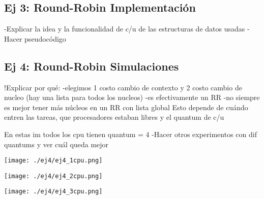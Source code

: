 \subsection{Ej 3: Round-Robin Implementación}
-Explicar la idea y la funcionalidad de c/u de las
estructuras de datos usadas
-Hacer pseudocódigo

\subsection{Ej 4: Round-Robin Simulaciones}

!Explicar por qué: 
-elegimos 1 costo cambio de contexto y 2 costo cambio de nucleo (hay una lista para todos los nucleos)
-es efectivamente un RR
-no siempre es mejor tener más núcleos en un RR con lista global
Esto depende de cuándo entren las tareas, que procesadores
estaban libres y el quantum de c/u

En estas im todos los cpu tienen quantum = 4
-Hacer otros experimentos con dif quantums y ver cuál queda mejor

\begin{center}
 \texttt{[image: ./ej4/ej4\_1cpu.png]}
\end{center}

\begin{center}
 \texttt{[image: ./ej4/ej4\_2cpu.png]}
\end{center}

\begin{center}
 \texttt{[image: ./ej4/ej4\_3cpu.png]}
\end{center}

